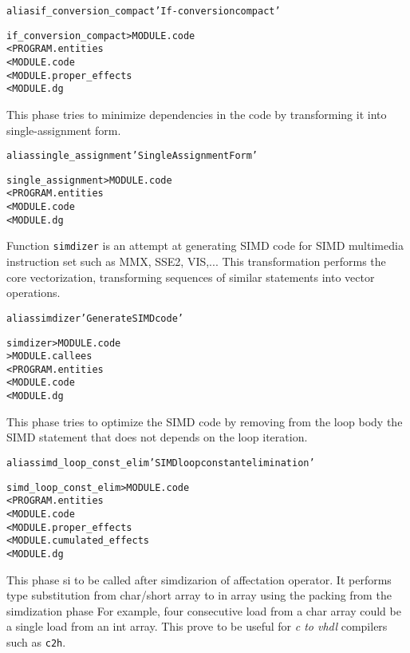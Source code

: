 \documentclass[a4paper]{report}
\newenvironment{PipsMake}{\begin{alltt}}{\end{alltt}}
\begin{document}
\begin{PipsMake}
alias if_conversion_compact 'If-conversion compact'

if_conversion_compact                  > MODULE.code
        < PROGRAM.entities
        < MODULE.code
        < MODULE.proper_effects
        < MODULE.dg
\end{PipsMake}


This phase tries to minimize dependencies in the code by transforming
it into single-assignment form.

\begin{PipsMake}
alias single_assignment 'Single Assignment Form'

single_assignment           > MODULE.code
        < PROGRAM.entities
        < MODULE.code
        < MODULE.dg
\end{PipsMake}%

Function \verb+simdizer+ is an attempt at generating SIMD code for SIMD
multimedia instruction set such as MMX, SSE2, VIS,... This
transformation performs the core vectorization, transforming sequences
of similar statements into vector operations.

\begin{PipsMake}
alias simdizer 'Generate SIMD code'

simdizer                    > MODULE.code
                            > MODULE.callees
        < PROGRAM.entities
        < MODULE.code
        < MODULE.dg
\end{PipsMake}


This phase tries to optimize the SIMD code by removing from the loop body
the SIMD statement that does not depends on the loop iteration.

\begin{PipsMake}
alias simd_loop_const_elim 'SIMD loop constant elimination'

simd_loop_const_elim                    > MODULE.code
        < PROGRAM.entities
        < MODULE.code
        < MODULE.proper_effects
        < MODULE.cumulated_effects
        < MODULE.dg
\end{PipsMake}

This phase si to be called after simdizarion of affectation operator.
It performs type substitution from char/short array to in array
using the packing from the simdization phase
For example, four consecutive load from a char array could be a single load from an int array.
This prove to be useful for \textit{c to vhdl} compilers such as \texttt{c2h}.
\end{document}
